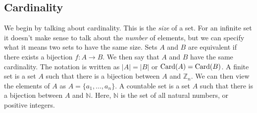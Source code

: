         \subsection{Cardinality}
            We begin by talking about cardinality. This is the
            \textit{size} of a set. For an infinite set it
            doesn't make sense to talk about the \textit{number}
            of elements, but we can specify what it means two sets
            to have the same size. Sets $A$ and $B$ are equivalent
            if there exists a bijection $f:A\rightarrow{B}$.
            We then say that $A$ and $B$ have the same cardinality.
            The notation is written as $|A|=|B|$ or
            $\operatorname{Card}(A)=\operatorname{Card}(B)$. A finite set is a set $A$ such that
            there is a bijection between $A$ and $\mathbb{Z}_{n}$.
            We can then view the elements of $A$ as
            $A=\{a_{1},\hdots,a_{n}\}$. A countable set is a set
            $A$ such that there is a bijection between $A$ and
            $\mathbb{N}$. Here, $\mathbb{N}$ is the set of all
            natural numbers, or positive integers.
